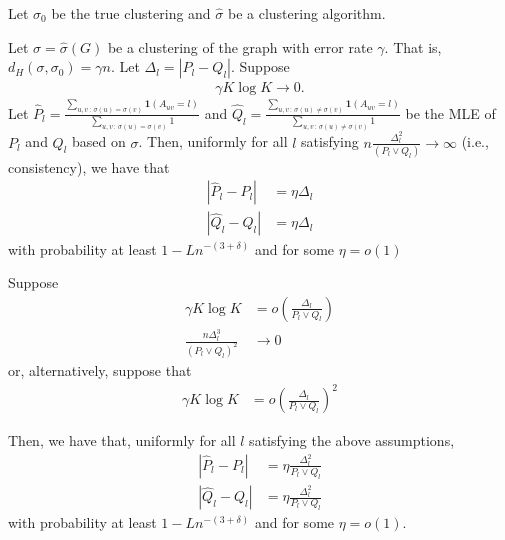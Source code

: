 \documentclass{article}
\begin{document}
Let $\sigma_0$ be the true clustering and $\hat{\sigma}$ be a clustering algorithm.


\begin{shaded}
\begin{proposition}
\label{prop:estimation_consistency}
Let $\sigma = \hat{\sigma}(G)$ be a clustering of the graph with error rate $\gamma$. That is, $d_H(\sigma, \sigma_0) = \gamma n$. Let $\Delta_l = | P_l - Q_l |$. Suppose 
\begin{align}
\gamma K \log K \rightarrow 0. 
\end{align}
Let $\hat{P}_l = \frac{\sum_{u,v \,:\, \sigma(u)=\sigma(v)} \mathbf{1}(A_{uv} = l) }
                      {\sum_{u,v \,:\, \sigma(u) = \sigma(v)} 1}$ and
    $\hat{Q}_l = \frac{\sum_{u,v \,:\, \sigma(u) \neq \sigma(v)} \mathbf{1}(A_{uv} = l) }
                      {\sum_{u,v \,:\, \sigma(u) \neq \sigma(v)} 1}$ be the MLE of $P_l$ and $Q_l$ based on $\sigma$. 
Then, uniformly for all $l$ satisfying $ n \frac{\Delta_l^2}{(P_l \vee Q_l)} \rightarrow \infty$ (i.e., consistency), we have that
\begin{align}
| \hat{P}_l - P_l | &= \eta \Delta_l \\
| \hat{Q}_l - Q_l | &= \eta \Delta_l
\end{align}
with probability at least $1 - Ln^{-(3+\delta)}$ and for some $\eta = o(1)$ 
\end{proposition}
\end{shaded}

\begin{proposition}
\label{prop:strong_estimation_consistency}
Suppose
\begin{align}
\gamma K \log K &= o \left( \frac{\Delta_l}{P_l \vee Q_l} \right)  
   \label{eqn:rate_assumption}\\
\frac{n \Delta_l^3}{ (P_l \vee Q_l)^2 } &\rightarrow 0
    \label{eqn:gamma_assumption}
\end{align}
or, alternatively, suppose that
\begin{align}
\gamma K \log K &= o \left( \frac{\Delta_l}{P_l \vee Q_l} \right)^2 
    \label{eqn:stronger_gamma_assumption}
\end{align}

Then, we have that, uniformly for all $l$ satisfying the above assumptions,  
\begin{align}
| \hat{P}_l - P_l | &= \eta \frac{\Delta_l^2}{P_l \vee Q_l}  \\
| \hat{Q}_l - Q_l | &= \eta \frac{\Delta_l^2}{P_l \vee Q_l} 
\end{align}
with probability at least $1- Ln^{-(3+\delta)}$ and for some $\eta = o(1)$. 
\end{proposition}
\end{document}
